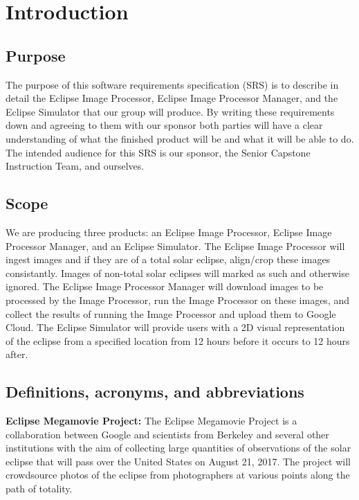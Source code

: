 \documentclass[10pt, onecolumn, draftclsnofoot, letterpaper, compsoc]{IEEEtran}
\begin{document}
\section{Introduction}

\subsection{Purpose}
The purpose of this software requirements specification (SRS) is to describe in
detail the Eclipse Image Processor, Eclipse Image Processor Manager, and the Eclipse
Simulator that our group will
produce. By writing these requirements down and agreeing to them with our
sponsor both parties will have a clear understanding of what the finished
product will be and what it will be able to do. The intended audience for this
SRS is our sponsor, the Senior Capstone Instruction Team, and ourselves.

\subsection{Scope}
We are producing  three products: an Eclipse Image Processor, Eclipse
Image Processor Manager, and an Eclipse
Simulator. The Eclipse Image Processor will ingest images and if
they are of a total solar eclipse, align/crop these images consistantly. Images of non-total
solar eclipses will marked as such and otherwise ignored. The Eclipse Image Processor Manager
will download images to be processed by the Image Processor, run the Image Processor on these images,
and collect the results of running the Image Processor and upload them to Google Cloud. The Eclipse
Simulator will provide users with a 2D visual representation of the eclipse from a
specified location from 12 hours before it occurs to 12 hours after.

\subsection{Definitions, acronyms, and abbreviations}

	\textbf{Eclipse Megamovie Project:}
	The Eclipse Megamovie Project is a collaboration between Google
	and scientists from Berkeley and several other institutions with the
	aim of collecting large quantities of observations of the solar eclipse
	that will pass over the United States on August 21, 2017. The project
	will crowdsource photos of the eclipse from photographers at various
	points along the path of totality. \\
\end{document}
